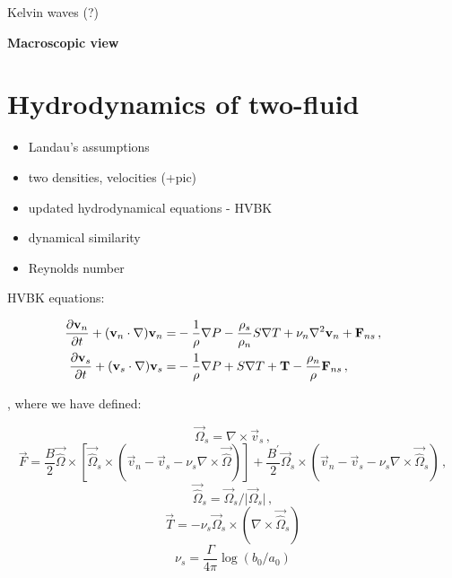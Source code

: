 Kelvin waves (?)

\newpage

{\Huge \bfseries Macroscopic view}
\vspace{0.3cm}

\section{Hydrodynamics of two-fluid}
\begin{itemize}
	\item Landau's assumptions
	\item two densities, velocities (+pic)
	\item updated hydrodynamical equations - HVBK
	\item dynamical similarity
	\item Reynolds number
\end{itemize}

HVBK equations:

\begin{align}
\frac{\partial\vec{v}_n}{\partial t} + (\vec{v}_n\cdot \nabla)\vec{v}_n =& -\frac{1}{\rho} \nabla P - \frac{\rho_s}{\rho_n} S \nabla T + \nu_n \nabla^2 \vec{v}_n + \vec{F}_{ns}\,,
\label{motion_normal}\\
\frac{\partial\vec{v}_s}{\partial t} + (\vec{v}_s\cdot \nabla)\vec{v}_s =& -\frac{1}{\rho} \nabla P + S \nabla T + \vec{T} - \frac{\rho_n}{\rho} \vec{F}_{ns}\,,
\hspace{15mm}
\label{motion_super}
\end{align}

, where we have defined:

\begin{equation}
\vec{\Omega}_s = \nabla \times \vec{v}_s\,,
\end{equation}
\begin{equation}
\vec{F} = \frac{B}{2} \vec{\hat{\Omega}} \times [\vec{\hat{\Omega}}_s \times (\vec{v}_n - \vec{v}_s - \nu_s\nabla \times \vec{\hat{\Omega}})]
+ \frac{B^{\prime}}{2} \vec{\Omega}_s \times (\vec{v}_n - \vec{v}_s - \nu_s\nabla \times \vec{\hat{\Omega}}_s)\,,
\end{equation}
\begin{equation}
\vec{\hat{\Omega}}_s = \vec{\Omega}_s / \vert \vec{\Omega}_s \vert\,,
\end{equation}
\begin{equation}
\vec{T} = -\nu_s \vec{\Omega}_s \times (\nabla \times \vec{\hat{\Omega}}_s)
\end{equation}
\begin{equation}
\nu_s = \frac{\Gamma}{4\pi} \log(b_0 / a_0)
\end{equation}

